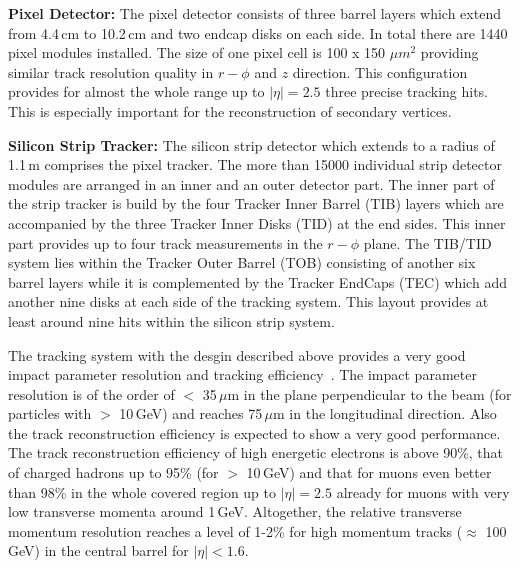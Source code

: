 \begin{description}
 \item \textbf{Pixel Detector:} The pixel detector consists of three barrel layers which extend from 4.4\,cm to 10.2\,cm and two endcap disks on each side. In total there are 1440 pixel modules installed. The size of one pixel cell is 100 x 150 $\mu m^2$ providing similar track resolution quality in $r-\phi$ and $z$ direction. This configuration provides for almost the whole range up to $|\eta| = 2.5$ three precise tracking hits. This is especially important for the reconstruction of secondary vertices.
 \item \textbf{Silicon Strip Tracker:} The silicon strip detector which extends to a radius of 1.1\,m comprises the pixel tracker. The more than 15000 individual strip detector modules are arranged in an inner and an outer detector part. The inner part of the strip tracker is build by the four Tracker Inner Barrel (TIB) layers which are accompanied by the three Tracker Inner Disks (TID) at the end sides. This inner part provides up to four track measurements in the $r-\phi$ plane. The TIB/TID system lies within the Tracker Outer Barrel (TOB) consisting of another six barrel layers while it is complemented by the Tracker EndCaps (TEC) which add another nine disks at each side of the tracking system. This layout provides at least around nine hits within the silicon strip system. 
\end{description}
The tracking system with the desgin described above provides a very good impact parameter resolution and tracking efficiency~\cite{bib:cmstdr:tracker}. The impact parameter resolution is of the order of $<$ 35\,$\mu$m in the plane perpendicular to the beam (for particles with \pt $>$ 10\,GeV) and reaches 75\,$\mu$m in the longitudinal direction. Also the track reconstruction efficiency is expected to show a very good performance. The track reconstruction efficiency of high energetic electrons is above 90\%, that of charged hadrons up to 95\% (for \pt $>$ 10\,GeV) and that for muons even better than 98\% in the whole covered region up to $|\eta| = 2.5$ already for muons with very low transverse momenta around 1\,GeV. Altogether, the relative transverse momentum resolution reaches a level of 1-2\% for high momentum tracks ($\approx$ 100\,GeV) in the central barrel for $|\eta| < 1.6$.
 

